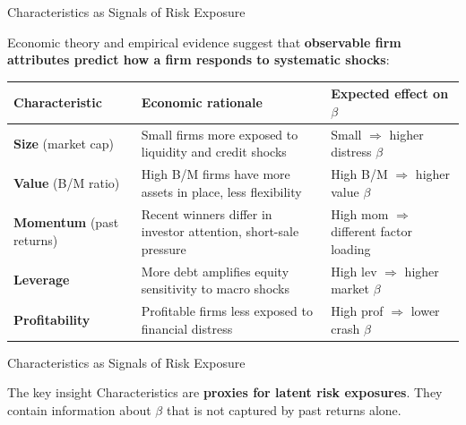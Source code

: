 \documentclass[aspectratio=169, 10pt]{beamer}
\begin{document}
%
%
\begin{frame}{Characteristics as Signals of Risk Exposure}

Economic theory and empirical evidence suggest that \textbf{observable firm attributes
predict how a firm responds to systematic shocks}:

\bigskip
\begin{center}
\begin{tabular}{p{3.2cm} p{4.5cm} p{4.5cm}}
\toprule
\textbf{Characteristic} & \textbf{Economic rationale} & \textbf{Expected effect on $\beta$} \\
\midrule
\textbf{Size} (market cap)
  & Small firms more exposed to liquidity and credit shocks
  & Small $\Rightarrow$ higher distress $\beta$ \\[6pt]
\textbf{Value} (B/M ratio)
  & High B/M firms have more assets in place, less flexibility
  & High B/M $\Rightarrow$ higher value $\beta$ \\[6pt]
\textbf{Momentum} (past returns)
  & Recent winners differ in investor attention, short-sale pressure
  & High mom $\Rightarrow$ different factor loading \\[6pt]
\textbf{Leverage}
  & More debt amplifies equity sensitivity to macro shocks
  & High lev $\Rightarrow$ higher market $\beta$ \\[6pt]
\textbf{Profitability}
  & Profitable firms less exposed to financial distress
  & High prof $\Rightarrow$ lower crash $\beta$ \\
\bottomrule
\end{tabular}
\end{center}
\end{frame}
%
%
\begin{frame}{Characteristics as Signals of Risk Exposure}
\begin{block}{The key insight}
Characteristics are \textbf{proxies for latent risk exposures}. They contain information
about $\beta$ that is not captured by past returns alone.
\end{block}

\end{frame}

\end{document}
